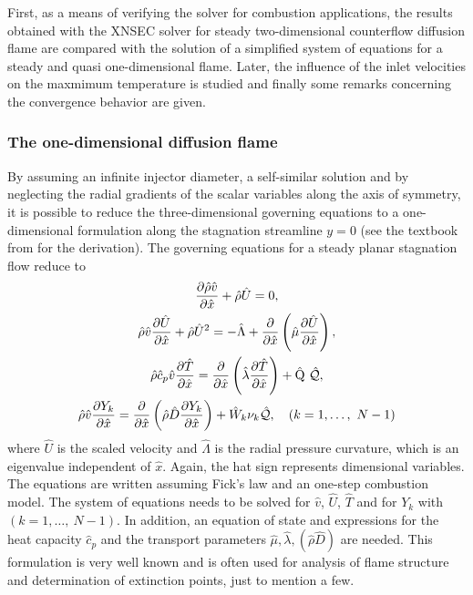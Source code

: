 First, as a means of verifying the solver for combustion applications, the results obtained with the XNSEC solver for steady two-dimensional counterflow diffusion flame are compared with the solution of a simplified system of equations for a steady and quasi one-dimensional flame. Later, the influence of the inlet velocities on the maxmimum temperature is studied and finally some remarks concerning the convergence behavior are given. 
\subsubsection{The one-dimensional diffusion flame}
By assuming an infinite injector diameter, a self-similar solution and by neglecting the radial gradients of the scalar variables along the axis of symmetry, it is possible to reduce the three-dimensional governing equations to a one-dimensional formulation along the stagnation streamline $y = 0$ (see the textbook from \textcite{keeChemicallyReactingFlow2003} for the derivation).  The governing equations for a steady planar stagnation flow reduce to
\begin{subequations}
\begin{gather}
	\frac{\partial\hat\rho \hat v}{\partial \hat x} +  \hat \rho \hat U = 0,\label{eq:OneDimCont}\\ %
	\hat \rho \hat v \frac{\partial \hat U}{\partial \hat x} + \hat \rho \hat U^2 =
	- \hat \Lambda
	+ \frac{\partial}{\partial \hat x}\left(\hat \mu \frac{\partial \hat U}{\partial \hat x}\right),\label{eq:OneDimMom}\\ %
	\hat\rho \hat c_p \hat v \frac{\partial \hat T}{\partial\hat x} =
	\frac{\partial}{\partial \hat x}\left( \hat \lambda \frac{\partial \hat T}{\partial \hat x}\right)
	+\hat\heatRelease~\hat{\mathcal{Q}}\label{eq:OneDimTemp},\\
	\hat\rho \hat v \frac{\partial Y_k}{\partial \hat x} = 
	\frac{\partial}{\partial \hat x}\left(\hat \rho \hat D \frac{\partial Y_k}{\partial \hat x}\right)
	+ \hat W_k \stoicCoef_k \hat{\mathcal{Q}}, \quad (k = 1, \dots,~N - 1) \label{eq:OneDimMF}
\end{gather}\label{eqs:OneDimEquations}%
\end{subequations}
where $\hat U$ is the scaled velocity and $\hat \Lambda$ is the radial pressure curvature, which is an eigenvalue independent of $\hat x$. Again, the hat sign represents dimensional variables. The equations are written assuming Fick's law and an one-step combustion model. The system of equations needs to be solved for $\hat v$, $\hat U$, $\hat T$ and for $Y_k$ with $ (k = 1, \dots,~N - 1)$.  In addition, an equation of state and expressions for the heat capacity $\hat c_p$ and the transport parameters $\hat \mu, \hat \lambda, (\hat \rho \hat D)$ are needed. This formulation is very well known and is often used for analysis of flame structure and determination of extinction points, just to mention a few.

